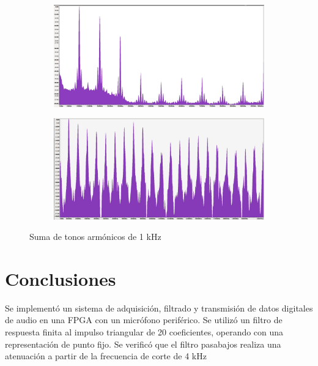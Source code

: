 \documentclass[12pt,letterpaper]{article}
\begin{document}
\begin{figure}[h!]
    \centering
    \begin{subfigure}[Espectro de la señal filtrada]
        \centering
        \includegraphics[width=0.45\linewidth]{Suma_tonos.jpg}
    \end{subfigure}
    
    \begin{subfigure}[Espectro de la señal original]
        \centering
        \includegraphics[width=0.45\linewidth]{suma_orig.jpg}
    \end{subfigure}
    \caption{Suma de tonos armónicos de 1 kHz}
\end{figure}

\section{Conclusiones}

Se implementó un sistema de adquisición, filtrado y transmisión de datos digitales de audio en una FPGA con un micrófono periférico. Se utilizó un filtro de respuesta finita al impulso triangular de 20 coeficientes, operando con una representación de punto fijo. Se verificó que el filtro pasabajos realiza una atenuación a partir de la frecuencia de corte de 4 kHz


\begin{thebibliography}{}
    
\end{thebibliography}
\end{document}
